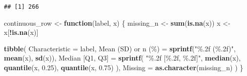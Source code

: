 \documentclass[
]{article}
\newenvironment{Shaded}{\begin{snugshade}}{\end{snugshade}}
\newcommand{\AttributeTok}[1]{\textcolor[rgb]{0.13,0.29,0.53}{#1}}
\newcommand{\ControlFlowTok}[1]{\textcolor[rgb]{0.13,0.29,0.53}{\textbf{#1}}}
\newcommand{\FloatTok}[1]{\textcolor[rgb]{0.00,0.00,0.81}{#1}}
\newcommand{\FunctionTok}[1]{\textcolor[rgb]{0.13,0.29,0.53}{\textbf{#1}}}
\newcommand{\NormalTok}[1]{#1}
\newcommand{\OtherTok}[1]{\textcolor[rgb]{0.56,0.35,0.01}{#1}}
\newcommand{\SpecialCharTok}[1]{\textcolor[rgb]{0.81,0.36,0.00}{\textbf{#1}}}
\newcommand{\StringTok}[1]{\textcolor[rgb]{0.31,0.60,0.02}{#1}}
\begin{document}
\begin{verbatim}
## [1] 266
\end{verbatim}

\begin{Shaded}
\begin{Highlighting}[]
\NormalTok{continuous\_row }\OtherTok{\textless{}{-}} \ControlFlowTok{function}\NormalTok{(label, x) \{}
\NormalTok{  missing\_n }\OtherTok{\textless{}{-}} \FunctionTok{sum}\NormalTok{(}\FunctionTok{is.na}\NormalTok{(x))}
\NormalTok{  x }\OtherTok{\textless{}{-}}\NormalTok{ x[}\SpecialCharTok{!}\FunctionTok{is.na}\NormalTok{(x)]}

  \FunctionTok{tibble}\NormalTok{(}
    \AttributeTok{Characteristic =}\NormalTok{ label,}
    \StringTok{\textasciigrave{}}\AttributeTok{Mean (SD) or n (\%)}\StringTok{\textasciigrave{}} \OtherTok{=}
      \FunctionTok{sprintf}\NormalTok{(}\StringTok{"\%.2f (\%.2f)"}\NormalTok{, }\FunctionTok{mean}\NormalTok{(x), }\FunctionTok{sd}\NormalTok{(x)),}
    \StringTok{\textasciigrave{}}\AttributeTok{Median [Q1, Q3]}\StringTok{\textasciigrave{}} \OtherTok{=}
      \FunctionTok{sprintf}\NormalTok{(}
        \StringTok{"\%.2f [\%.2f, \%.2f]"}\NormalTok{,}
        \FunctionTok{median}\NormalTok{(x),}
        \FunctionTok{quantile}\NormalTok{(x, }\FloatTok{0.25}\NormalTok{),}
        \FunctionTok{quantile}\NormalTok{(x, }\FloatTok{0.75}\NormalTok{)}
\NormalTok{      ),}
    \AttributeTok{Missing =} \FunctionTok{as.character}\NormalTok{(missing\_n)}
\NormalTok{  )}
\NormalTok{\}}
\end{Highlighting}
\end{Shaded}
\end{document}
